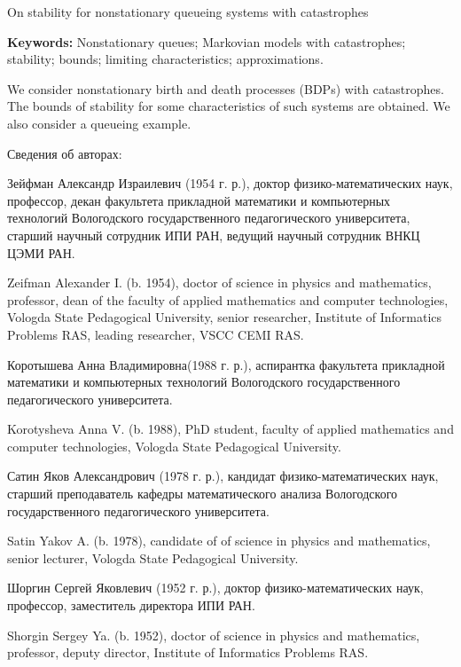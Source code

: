 On stability for nonstationary queueing systems with catastrophes

\medskip
{\bf Keywords:} Nonstationary queues; Markovian models with
catastrophes; stability; bounds; limiting characteristics;
approximations.

\medskip

We consider nonstationary birth and death processes (BDPs) with
catastrophes. The bounds of stability for some characteristics of such systems are obtained. We
also  consider a queueing example.



\newpage

Сведения об авторах:

Зейфман Александр Израилевич (1954 г. р.), доктор
физико-математических наук, профессор, декан факультета прикладной
математики и компьютерных технологий Вологодского государственного
педагогического университета, старший научный сотрудник ИПИ РАН,
ведущий научный сотрудник ВНКЦ ЦЭМИ РАН.

Zeifman Alexander I. (b. 1954), doctor of science in physics and
mathematics, professor, dean of the faculty of applied mathematics
and computer technologies, Vologda State Pedagogical University,
senior researcher, Institute of Informatics Problems RAS, leading
researcher, VSCC CEMI RAS.

\medskip
\medskip


Коротышева Анна Владимировна(1988 г. р.), аспирантка факультета
прикладной математики и компьютерных технологий Вологодского
государственного педагогического университета.

Korotysheva Anna V. (b. 1988), PhD student, faculty of applied
mathematics and computer technologies, Vologda State Pedagogical University.


\medskip


Сатин Яков Александрович (1978 г. р.), кандидат
физико-математических наук, старший преподаватель кафедры
математического анализа Вологодского государственного
педагогического университета.

Satin Yakov A. (b. 1978), candidate of of science in physics and
mathematics, senior lecturer, Vologda State Pedagogical University.


\medskip
Шоргин Сергей Яковлевич (1952 г. р.), доктор
физико-математических наук, профессор, заместитель директора ИПИ РАН.


Shorgin Sergey Ya. (b. 1952), doctor of science in physics and
mathematics, professor, deputy director, Institute of Informatics Problems RAS.
